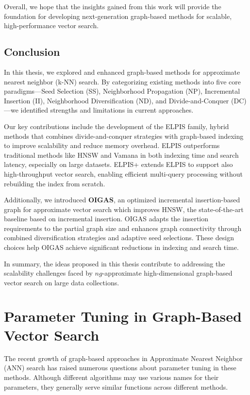 Overall, we hope that the insights gained from this work will provide the foundation for developing next-generation graph-based methods for scalable, high-performance vector search.

\section{Conclusion}
In this thesis, we explored and enhanced graph-based methods for approximate nearest neighbor (k-NN) search. By categorizing existing methods into five core paradigms—Seed Selection (SS), Neighborhood Propagation (NP), Incremental Insertion (II), Neighborhood Diversification (ND), and Divide-and-Conquer (DC)—we identified strengths and limitations in current approaches.

Our key contributions include the development of the ELPIS family, hybrid methods that combines divide-and-conquer strategies with graph-based indexing to improve scalability and reduce memory overhead. ELPIS outperforms traditional methods like HNSW and Vamana in both indexing time and search latency, especially on large datasets. ELPIS+ extends ELPIS to support also high-throughput vector search, enabling efficient multi-query processing without rebuilding the index from scratch.

Additionally, we introduced \textbf{OIGAS}, an optimized incremental insertion-based graph for approximate vector search which improves HNSW, the state-of-the-art baseline based on  incremental insertion.  OIGAS adapts the insertion requirements to the partial graph size and enhances graph connectivity through combined diversification strategies and adaptive seed selections. These design choices help OIGAS achieve significant reductions in indexing and search time.

In summary, the ideas proposed in this thesis contribute to addressing the scalability challenges faced by $ng$-approximate high-dimensional graph-based vector search on large data collections. 

\appendix

\chapter{Parameter Tuning in Graph-Based Vector Search}
\label{appendix:parameters}
The recent growth of graph-based approaches in Approximate Nearest Neighbor (ANN) search has raised numerous questions about parameter tuning in these methods. Although different algorithms may use various names for their parameters, they generally serve similar functions across different methods.

